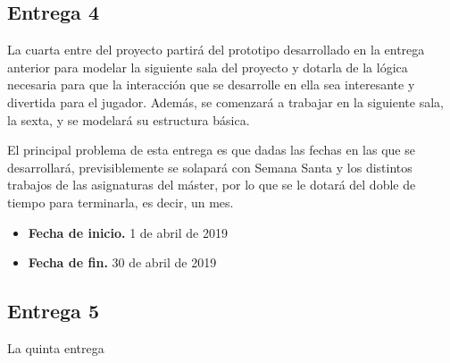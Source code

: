 \subsection{Entrega 4}

La cuarta entre del proyecto partirá del prototipo desarrollado en la entrega anterior para modelar la siguiente sala del proyecto y dotarla de la lógica necesaria para que la interacción que se desarrolle en ella sea interesante y divertida para el jugador. Además, se comenzará a trabajar en la siguiente sala, la sexta, y se modelará su estructura básica.

El principal problema de esta entrega es que dadas las fechas en las que se desarrollará, previsiblemente se solapará con Semana Santa y los distintos trabajos de las asignaturas del máster, por lo que se le dotará del doble de tiempo para terminarla, es decir, un mes.

\begin{itemize}
    \item \textbf{Fecha de inicio.} 1 de abril de 2019
    \item \textbf{Fecha de fin.} 30 de abril de 2019
\end{itemize}

\subsection{Entrega 5}

La quinta entrega

